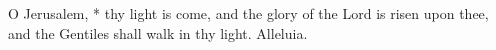 O Jerusalem, * thy light is come, and the glory of the Lord is risen upon thee, and the Gentiles shall walk in thy light. Alleluia.